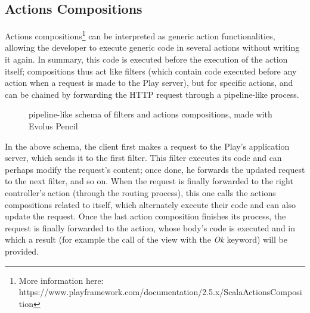 \documentclass[a4paper,11pt]{report}
\begin{document}
\subsection{Actions Compositions}
\label{actionsCompositions}
Actions compositions\footnote{More information here: https://www.playframework.com/documentation/2.5.x/ScalaActionsComposition} can be interpreted as generic action functionalities, allowing the developer to execute generic code in several actions without writing it again. In summary, this code is executed before the execution of the action itself; compositions thus act like filters (which contain code executed before any action when a request is made to the Play server), but for specific actions, and can be chained by forwarding the HTTP request through a pipeline-like process.
\begin{figure}[H]
\vspace{-5pt}
\begin{center}
\vspace{-5pt}
\caption{pipeline-like schema of filters and actions compositions, made with Evolus Pencil}
\end{center}
\end{figure}
\vspace{-10pt}
In the above schema, the client first makes a request to the Play's application server, which sends it to the first filter. This filter executes its code and can perhaps modify the request's content; once done, he forwards the updated request to the next filter, and so on. When the request is finally forwarded to the right controller's action (through the routing process), this one calls the actions compositions related to itself, which alternately execute their code and can also update the request. Once the last action composition finishes its process, the request is finally forwarded to the action, whose body's code is executed and in which a result (for example the call of the view with the \emph{Ok} keyword) will be provided.
\end{document}
